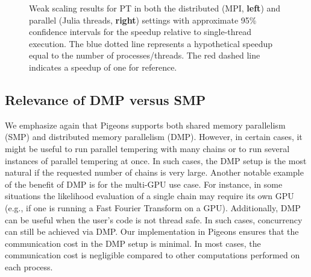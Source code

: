 \begin{figure}[t]
\begin{minipage}{0.4\textwidth}
    \end{minipage}
    \caption{
        Weak scaling results for PT in both the distributed (MPI, {\bf left}) 
        and parallel (Julia threads, {\bf right}) settings 
        with approximate 95\% confidence intervals for the speedup relative to single-thread execution.   
        The blue dotted line represents a hypothetical speedup equal to the 
        number of processes/threads. 
        The red dashed line indicates a speedup of one for reference.
    }
    \label{fig:PT_scaling}
\end{figure}


\subsection{Relevance of DMP versus SMP}

We emphasize again that Pigeons supports both shared memory 
parallelism (SMP) and distributed memory parallelism (DMP). However, in certain cases, it 
might be useful to run parallel tempering with  many chains or 
to run several instances of parallel tempering at once. In such cases, 
the DMP setup is the most natural if the requested number of chains is very large. 
Another notable example of the benefit of DMP is for the multi-GPU use case. 
For instance, in some situations the likelihood evaluation of a single chain may 
require its own GPU (e.g., if one is running a Fast Fourier Transform on a GPU). 
Additionally, DMP can be useful when the user's code is not thread safe. 
In such cases, concurrency can still be achieved via DMP.
Our implementation in Pigeons ensures that the 
communication cost in the DMP setup is minimal. In most cases, the 
communication cost is negligible compared to other computations performed on each process. 

